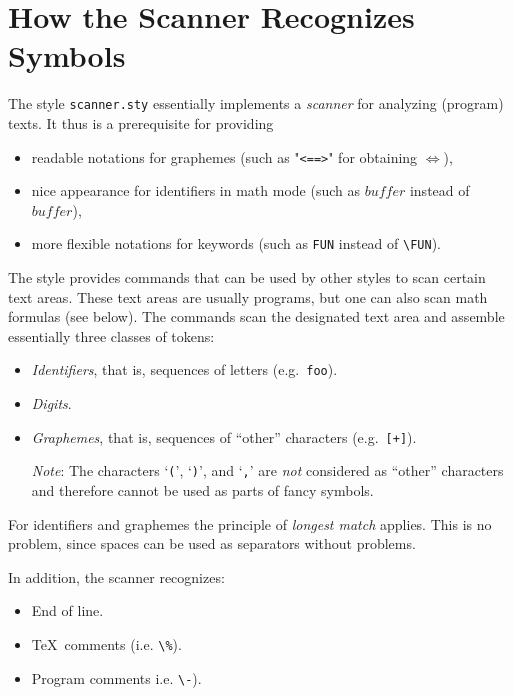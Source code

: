 


\section{How the Scanner Recognizes Symbols}
\label{sec:Scanner}

The style \texttt{scanner.sty} essentially implements a \emph{scanner} for
analyzing (program) texts. It thus is a prerequisite for providing
\begin{itemize}
  \item readable notations for graphemes (such as "\verb+<==>+" for
    obtaining $\Longleftrightarrow$),
  \item nice appearance for identifiers in math mode (such as
    $\mathit{buffer}$ instead of $buffer$),
  \item more flexible notations for keywords (such as \verb=FUN= instead of
    \verb=\FUN=).
\end{itemize}


The style provides commands that can be used by other styles to scan certain
text areas. These text areas are usually programs, but one can also scan
math formulas (see below).
The commands scan the designated text area and assemble essentially three
classes of tokens:
\begin{itemize}
  \item \emph{Identifiers}, that is, sequences of letters (e.g.~\verb=foo=).
  \item \emph{Digits}.
  \item \emph{Graphemes}, that is, sequences of ``other'' characters
    (e.g.~\verb=[+]=).

    \emph{Note}: The characters `\verb+(+', `\verb+)+', and `\verb+,+' are
    \emph{not} considered as ``other'' characters and therefore cannot be
    used as parts of fancy symbols.
\end{itemize}

For identifiers and graphemes the principle of \emph{longest match}
applies. This is no problem, since spaces can be used as separators without
problems.


In addition, the scanner recognizes:
\begin{itemize}
  \item End of line.
  \item \TeX~comments (i.e. \verb+\%+).
  \item Program comments i.e. \verb+\-+).
\end{itemize}







